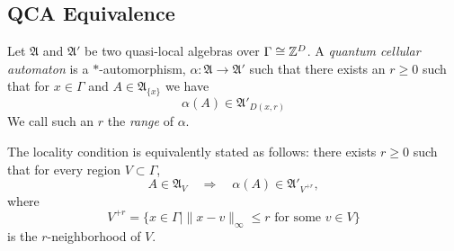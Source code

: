 \documentclass[11pt]{amsart}
\begin{document}
\subsection{QCA Equivalence}
\begin{defn}
	Let $\mathfrak A$ and $\mathfrak A'$ be two quasi-local algebras over $\Gamma\cong \mathbb{Z}^D$. A \emph{quantum cellular automaton} is a $*$-automorphism, $\alpha:\mathfrak A\to\mathfrak A'$ such that there exists an $r\geq 0$ such that for $x\in\Gamma$ and $A\in \mathfrak A_{\{x\}}$ we have 
	\[
		\alpha(A)\in \mathfrak A'_{D(x,r)}
	\]
	We call such an $r$ the \emph{range} of $\alpha$. 
\end{defn}
\begin{remark}
\label{rem:qca-locality-regions}
The locality condition is equivalently stated as follows: there exists $r\geq 0$
such that for every region $V\subset\Gamma$,
\[
 A\in\mathfrak A_V\quad\Longrightarrow\quad
 \alpha(A)\in\mathfrak A'_{V^{+r}},
\]
where
\[
 V^{+r}=\{x\in\Gamma\mid \|x-v\|_\infty\leq r\text{ for some }v\in V\}
\]
is the $r$-neighborhood of $V$.
\end{remark}
\end{document}

